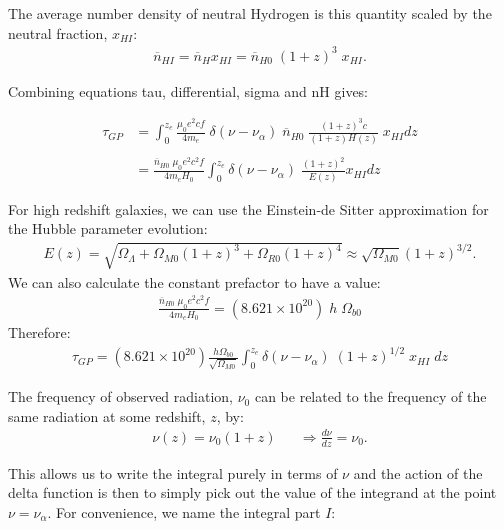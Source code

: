 \documentclass[pdf,color]{UoBnote}
\begin{document}
The average number density of neutral Hydrogen is this quantity scaled by the neutral fraction, $x_{HI}$:
\begin{align}
			 \overline{n}_{HI} = \overline{n}_H x_{HI} = \overline{n}_{H0} \; (1+z)^3 \; x_{HI} . 
\end{align} 

Combining equations tau, differential, sigma and nH gives:

\begin{align}
\tau_{GP} &= \int_0^{z_e} \frac{\mu_0 e^2 c f}{4 m_e} \; \delta(\nu - \nu_\alpha) \; \overline{n}_{H0} \; \frac{ (1+z)^3 c}{(1+z) H(z)} \; x_{HI} dz \\ \\
&= \frac{ \overline{n}_{H0} \; \mu_0 e^2 c^2 f}{4 m_e H_0} \int_0^{z_e} \delta(\nu - \nu_\alpha) \;  \frac{(1+z)^2}{ E(z)} x_{HI} dz 
\end{align}

For high redshift galaxies, we can use the Einstein-de Sitter approximation for the Hubble parameter evolution:
\begin{align}
			E(z) = \sqrt{ \Omega_\Lambda + \Omega_{M0} (1+z)^3 + \Omega_{R0} (1+z)^4} \approx \sqrt{\Omega_{M0}}(1+z)^{3/2}.
\end{align}
We can also calculate the constant prefactor to have a value:
\begin{align}
		\frac{ \overline{n}_{H0} \; \mu_0 e^2 c^2 f}{4 m_e H_0} = (8.621\times 10^{20} ) \; h \; \Omega_{b0}
\end{align}
Therefore:
\begin{align}
\tau_{GP} =   (8.621\times 10^{20} ) \frac{h \Omega_{b0}}{\sqrt{\Omega_{M0}}}  \int_0^{z_e} \delta(\nu - \nu_\alpha) \;  (1+z)^{1/2} \; x_{HI} \; dz
\end{align}

The frequency of observed radiation, $\nu_0$ can be related to the frequency of the same radiation at some redshift, $z$, by:
\begin{align}
			\nu (z) = \nu_0(1+z)  &&
	\Rightarrow 	\frac{d\nu}{dz} = \nu_0.
\end{align}

This allows us to write the integral purely in terms of $\nu$ and the action of the delta function is then to simply pick out the value of the integrand at the point $\nu = \nu_\alpha$. For convenience, we name the integral part $I$:
\end{document}
